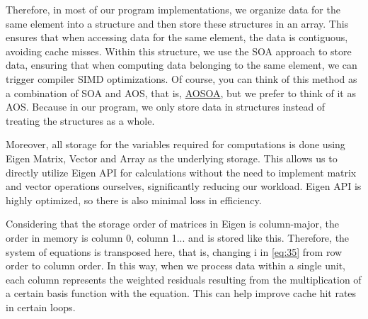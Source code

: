 \documentclass{develop-note}
\begin{document}
Therefore, in most of our program implementations, we organize data for the same element into a structure and then store these structures in an array. This ensures that when accessing data for the same element, the data is contiguous, avoiding cache misses. Within this structure, we use the SOA approach to store data, ensuring that when computing data belonging to the same element, we can trigger compiler SIMD optimizations. Of course, you can think of this method as a combination of SOA and AOS, that is, \href{https://en.wikipedia.org/wiki/AoS_and_SoA}{AOSOA}, but we prefer to think of it as AOS. Because in our program, we only store data in structures instead of treating the structures as a whole.

Moreover, all storage for the variables required for computations is done using Eigen Matrix, Vector and Array as the underlying storage. This allows us to directly utilize Eigen API for calculations without the need to implement matrix and vector operations ourselves, significantly reducing our workload. Eigen API is highly optimized, so there is also minimal loss in efficiency.

Considering that the storage order of matrices in Eigen is column-major, the order in memory is column 0, column 1... and is stored like this. Therefore, the system of equations is transposed here, that is, changing i in \autoref{eq:35} from row order to column order. In this way, when we process data within a single unit, each column represents the weighted residuals resulting from the multiplication of a certain basis function with the equation. This can help improve cache hit rates in certain loops.


\end{document}
